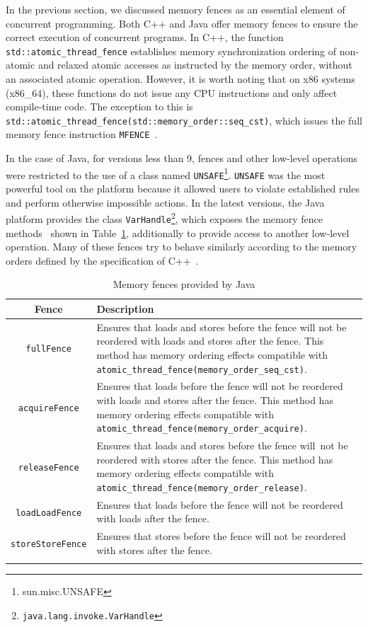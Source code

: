 In the previous section, we discussed memory fences as an essential element of concurrent programming. Both C++ and Java offer memory fences to ensure the correct execution of concurrent programs. In C++, the function \texttt{std::atomic\_thread\_fence} establishes memory synchronization ordering of non-atomic and relaxed atomic accesses as instructed by the memory order, without an associated atomic operation. However, it is worth noting that on x86 systems (x86\_64), these functions do not issue any CPU instructions and only affect compile-time code. The exception to this is \texttt{std::atomic\_thread\_fence(std::memory\_order::seq\_cst)}, which issues the full memory fence instruction \texttt{MFENCE}~\cite{memoryOrderCpp2020}.


In the case of Java, for versions less than 9, fences and other low-level operations were restricted to the use of a class named \texttt{UNSAFE}\footnote{sun.misc.UNSAFE}. \texttt{UNSAFE} was the most powerful tool on the platform because it allowed users to violate established rules and perform otherwise impossible actions. In the latest versions, the Java platform provides the class \texttt{VarHandle}\footnote{\texttt{java.lang.invoke.VarHandle}}, which exposes the memory fence methods~\cite{varHandleJdk92017} shown in Table~\ref{table:fences}, additionally to provide access to another low-level operation. Many of these fences try to behave similarly according to the memory orders defined by the specification of C++~\cite{memoryOrderCpp2020}.


  \begin{longtable}{|c|p{.72\linewidth}|}
    \hline
    \textbf{Fence} & \textbf{Description} \\
    \hline
    \texttt{fullFence} & Ensures that loads and stores before the fence will not be reordered with loads and stores after the fence. This method has memory ordering effects compatible with \texttt{atomic\_thread\_fence(memory\_order\_seq\_cst)}.\\
    \hline
    \texttt{acquireFence} & Ensures that loads before the fence will not be reordered with loads and stores after the fence. This method has memory ordering effects compatible with \texttt{atomic\_thread\_fence(memory\_order\_acquire)}.\\
    \hline
    \texttt{releaseFence} & Ensures that loads and stores before the fence will\ not be reordered with stores after the fence. This method has memory ordering effects compatible with  \texttt{atomic\_thread\_fence(memory\_order\_release)}.\\
    \hline
    \texttt{loadLoadFence} & Ensures that loads before the fence will not be reordered with loads after the fence.\\
    \hline
    \texttt{storeStoreFence} & Ensures that stores before the fence will not be reordered with stores after the fence.\\
    \hline
    \caption{\label{table:fences}Memory fences provided by Java}
  \end{longtable}


